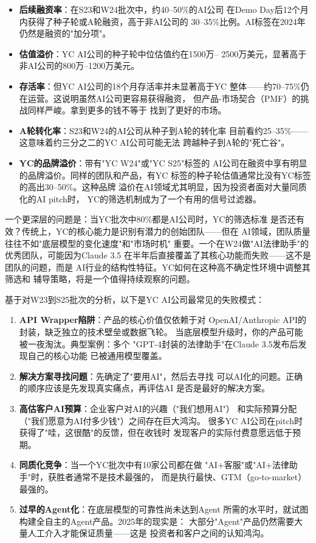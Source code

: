 \begin{itemize}
  \item \textbf{后续融资率}：在S23和W24批次中，约40--50\%的AI公司
    在Demo Day后12个月内获得了种子轮或A轮融资，高于非AI公司的
    30--35\%比例。AI标签在2024年仍然是融资的"加分项"。
  \item \textbf{估值溢价}：YC AI公司的种子轮中位估值约在1500万--
    2500万美元，显著高于非AI公司的800万--1200万美元。
  \item \textbf{存活率}：但YC AI公司的18个月存活率并未显著高于YC
    整体——约70--75\%仍在运营。这说明虽然AI公司更容易获得融资，
    但产品-市场契合（PMF）的挑战同样严峻。拿到更多的钱不等于
    找到了更好的市场。
  \item \textbf{A轮转化率}：S23和W24的AI公司从种子到A轮的转化率
    目前看约25--35\%——这意味着约三分之二的YC AI公司可能无法
    跨越种子到A轮的"死亡谷"。
  \item \textbf{YC的品牌溢价}：带有"YC W24"或"YC S25"标签的
    AI公司在融资中享有明显的品牌溢价。同样的团队和产品，有YC
    标签的种子轮估值通常比没有YC标签的高出30--50\%。这种品牌
    溢价在AI领域尤其明显，因为投资者面对大量同质化的AI pitch时，
    YC的筛选机制成为了一个有用的信号过滤器。
\end{itemize}

一个更深层的问题是：当YC批次中80\%都是AI公司时，YC的筛选标准
是否还有效？传统上，YC的核心能力是识别有潜力的创始团队——但在
AI领域，团队质量往往不如"底层模型的变化速度"和"市场时机"
重要。一个在W24做"AI法律助手"的优秀团队，可能因为Claude 3.5
在半年后直接覆盖了其核心功能而失败——这不是团队的问题，而是
AI行业的结构性特征。YC如何在这种高不确定性环境中调整其筛选和
辅导策略，将是一个值得持续观察的问题。

\begin{warnbox}[YC批次中AI公司的五个常见陷阱]
基于对W23到S25批次的分析，以下是YC AI公司最常见的失败模式：
\begin{enumerate}
  \item \textbf{API Wrapper陷阱}：产品的核心价值仅依赖于对
    OpenAI/Anthropic API的封装，缺乏独立的技术壁垒或数据飞轮。
    当底层模型升级时，你的产品可能被一夜淘汰。典型案例：多个
    "GPT-4封装的法律助手"在Claude 3.5发布后发现自己的核心功能
    已被通用模型覆盖。
  \item \textbf{解决方案寻找问题}：先确定了"要用AI"，然后去寻找
    可以AI化的问题。正确的顺序应该是先发现真实痛点，再评估AI
    是否是最好的解决方案。
  \item \textbf{高估客户AI预算}：企业客户对AI的兴趣（"我们想用AI"）
    和实际预算分配（"我们愿意为AI付多少钱"）之间存在巨大鸿沟。
    很多YC AI公司在pitch时获得了"哇，这很酷"的反馈，但在收钱时
    发现客户的实际付费意愿远低于预期。
  \item \textbf{同质化竞争}：当一个YC批次中有10家公司都在做
    "AI+客服"或"AI+法律助手"时，获胜者通常不是技术最强的，
    而是执行最快、GTM（go-to-market）最强的。
  \item \textbf{过早的Agent化}：在底层模型的可靠性尚未达到Agent
    所需的水平时，就试图构建全自主的Agent产品。2025年的现实是：
    大部分"Agent"产品仍然需要大量人工介入才能保证质量——这是
    投资者和客户之间的认知鸿沟。
\end{enumerate}
\end{warnbox}


